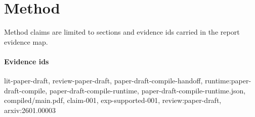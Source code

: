 \section{Method}
Method claims are limited to sections and evidence ids carried in the report evidence map.

\paragraph{Evidence ids} lit-paper-draft, review-paper-draft, paper-draft-compile-handoff, runtime:paper-draft-compile, paper-draft-compile-runtime, paper-draft-compile-runtime.json, compiled/main.pdf, claim-001, exp-supported-001, review:paper-draft, arxiv:2601.00003
